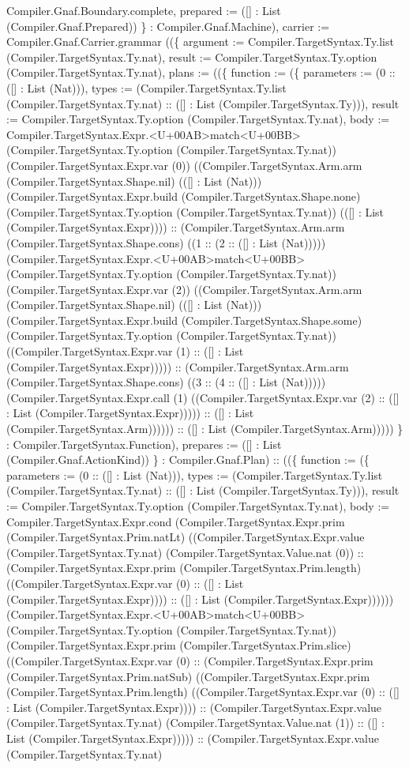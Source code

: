 \documentclass[11pt]{article}
\begin{document}
Compiler.Gnaf.Boundary.complete, prepared := ([] : List (Compiler.Gnaf.Prepared)) \} : Compiler.Gnaf.Machine), carrier := Compiler.Gnaf.Carrier.grammar ((\{ argument := Compiler.TargetSyntax.Ty.list (Compiler.TargetSyntax.Ty.nat), result := Compiler.TargetSyntax.Ty.option (Compiler.TargetSyntax.Ty.nat), plans := ((\{ function := (\{ parameters := (0 :: ([] : List (Nat))), types := (Compiler.TargetSyntax.Ty.list (Compiler.TargetSyntax.Ty.nat) :: ([] : List (Compiler.TargetSyntax.Ty))), result := Compiler.TargetSyntax.Ty.option (Compiler.TargetSyntax.Ty.nat), body := Compiler.TargetSyntax.Expr.<U+00AB>match<U+00BB> (Compiler.TargetSyntax.Ty.option (Compiler.TargetSyntax.Ty.nat)) (Compiler.TargetSyntax.Expr.var (0)) ((Compiler.TargetSyntax.Arm.arm (Compiler.TargetSyntax.Shape.nil) (([] : List (Nat))) (Compiler.TargetSyntax.Expr.build (Compiler.TargetSyntax.Shape.none) (Compiler.TargetSyntax.Ty.option (Compiler.TargetSyntax.Ty.nat)) (([] : List (Compiler.TargetSyntax.Expr)))) :: (Compiler.TargetSyntax.Arm.arm (Compiler.TargetSyntax.Shape.cons) ((1 :: (2 :: ([] : List (Nat))))) (Compiler.TargetSyntax.Expr.<U+00AB>match<U+00BB> (Compiler.TargetSyntax.Ty.option (Compiler.TargetSyntax.Ty.nat)) (Compiler.TargetSyntax.Expr.var (2)) ((Compiler.TargetSyntax.Arm.arm (Compiler.TargetSyntax.Shape.nil) (([] : List (Nat))) (Compiler.TargetSyntax.Expr.build (Compiler.TargetSyntax.Shape.some) (Compiler.TargetSyntax.Ty.option (Compiler.TargetSyntax.Ty.nat)) ((Compiler.TargetSyntax.Expr.var (1) :: ([] : List (Compiler.TargetSyntax.Expr))))) :: (Compiler.TargetSyntax.Arm.arm (Compiler.TargetSyntax.Shape.cons) ((3 :: (4 :: ([] : List (Nat))))) (Compiler.TargetSyntax.Expr.call (1) ((Compiler.TargetSyntax.Expr.var (2) :: ([] : List (Compiler.TargetSyntax.Expr))))) :: ([] : List (Compiler.TargetSyntax.Arm)))))) :: ([] : List (Compiler.TargetSyntax.Arm))))) \} : Compiler.TargetSyntax.Function), prepares := ([] : List (Compiler.Gnaf.ActionKind)) \} : Compiler.Gnaf.Plan) :: ((\{ function := (\{ parameters := (0 :: ([] : List (Nat))), types := (Compiler.TargetSyntax.Ty.list (Compiler.TargetSyntax.Ty.nat) :: ([] : List (Compiler.TargetSyntax.Ty))), result := Compiler.TargetSyntax.Ty.option (Compiler.TargetSyntax.Ty.nat), body := Compiler.TargetSyntax.Expr.cond (Compiler.TargetSyntax.Expr.prim (Compiler.TargetSyntax.Prim.natLt) ((Compiler.TargetSyntax.Expr.value (Compiler.TargetSyntax.Ty.nat) (Compiler.TargetSyntax.Value.nat (0)) :: (Compiler.TargetSyntax.Expr.prim (Compiler.TargetSyntax.Prim.length) ((Compiler.TargetSyntax.Expr.var (0) :: ([] : List (Compiler.TargetSyntax.Expr)))) :: ([] : List (Compiler.TargetSyntax.Expr)))))) (Compiler.TargetSyntax.Expr.<U+00AB>match<U+00BB> (Compiler.TargetSyntax.Ty.option (Compiler.TargetSyntax.Ty.nat)) (Compiler.TargetSyntax.Expr.prim (Compiler.TargetSyntax.Prim.slice) ((Compiler.TargetSyntax.Expr.var (0) :: (Compiler.TargetSyntax.Expr.prim (Compiler.TargetSyntax.Prim.natSub) ((Compiler.TargetSyntax.Expr.prim (Compiler.TargetSyntax.Prim.length) ((Compiler.TargetSyntax.Expr.var (0) :: ([] : List (Compiler.TargetSyntax.Expr)))) :: (Compiler.TargetSyntax.Expr.value (Compiler.TargetSyntax.Ty.nat) (Compiler.TargetSyntax.Value.nat (1)) :: ([] : List (Compiler.TargetSyntax.Expr))))) :: (Compiler.TargetSyntax.Expr.value (Compiler.TargetSyntax.Ty.nat) 
\end{document}
